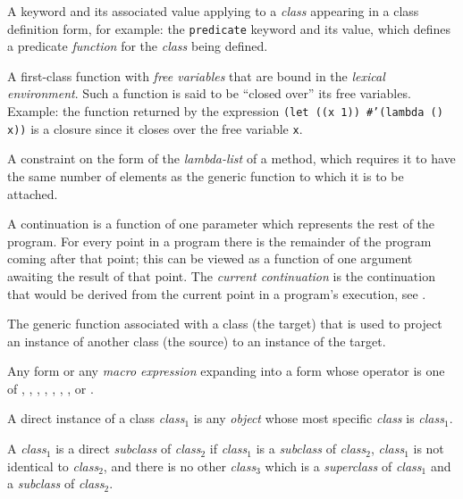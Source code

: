 \begin{optDefinition}
\begin{definitions}
     A keyword and its
    associated value applying to a {\em class} appearing in a class definition
    form, for example: the {\tt predicate} keyword and its value, which defines
    a predicate {\em function} for the {\em class} being defined.

     A first-class function with
    {\em free variables} that are bound in the {\em lexical environment}. Such a
    function is said to be ``closed over'' its free variables.  Example: the
    function returned by the expression {\tt (let ((x 1)) \#'(lambda () x))} is
    a closure since it closes over the free variable {\tt x}.

     A constraint on the form of
    the {\em lambda-list} of a method, which requires it to have the same number
    of elements as the generic function to which it is to be attached.

     A continuation is a
    function of one parameter which represents the rest of the program.  For
    every point in a program there is the remainder of the program coming after
    that point; this can be viewed as a function of one argument awaiting the
    result of that point.  The {\em current continuation} is the continuation
    that would be derived from the current point in a program's execution, see
    .

     The
    generic function associated with a class (the target) that is used to
    project an instance of another class (the source) to an instance of the
    target.

     Any form or any
    {\em macro expression} expanding into a form whose operator is one of
    , , ,
    , , ,
    , or .

     A direct instance of a class
    {\em class$_1$} is any {\em object} whose most specific {\em class} is {\em
        class$_1$}.

     A {\em class$_1$} is a direct
    {\em subclass} of {\em class$_2$} if {\em class$_1$} is a {\em subclass} of
    {\em class$_2$}, {\em class$_1$} is not identical to {\em class$_2$}, and
    there is no other {\em class$_3$} which is a {\em superclass} of {\em
        class$_1$} and a {\em subclass} of {\em class$_2$}.


\end{definitions}
\end{optDefinition}
